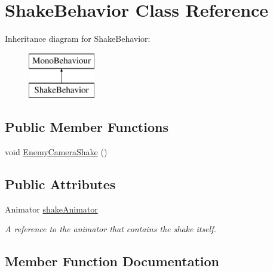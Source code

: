 \hypertarget{class_shake_behavior}{}\section{Shake\+Behavior Class Reference}
\label{class_shake_behavior}
Inheritance diagram for Shake\+Behavior\+:\begin{figure}[H]
\begin{center}
\leavevmode
\includegraphics[height=2.000000cm]{class_shake_behavior}
\end{center}
\end{figure}
\subsection*{Public Member Functions}
\begin{DoxyCompactItemize}
\item 
void \mbox{\hyperlink{class_shake_behavior_aa7d0f4a5ab0a8f566ce5203fe9f4b229}{Enemy\+Camera\+Shake}} ()
\end{DoxyCompactItemize}
\subsection*{Public Attributes}
\begin{DoxyCompactItemize}
\item 
\mbox{\label{class_shake_behavior_aae508c1977572a978bd931512057da10}} 
Animator \mbox{\hyperlink{class_shake_behavior_aae508c1977572a978bd931512057da10}{shake\+Animator}}
\begin{DoxyCompactList}\small\item\em A reference to the animator that contains the shake itself. \end{DoxyCompactList}\end{DoxyCompactItemize}


\subsection{Member Function Documentation}
\mbox{\label{class_shake_behavior_aa7d0f4a5ab0a8f566ce5203fe9f4b229}} 
